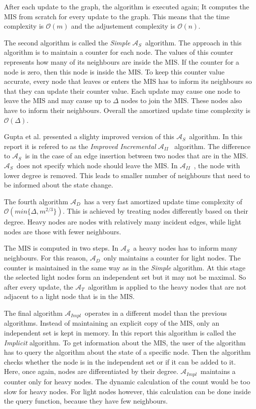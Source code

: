 \documentclass[letterpaper,11pt]{article}
\newcommand{\trivial}{$\mathcal{A}_T$\ }
\newcommand{\simple}{$\mathcal{A}_S$\ }
\newcommand{\improvedinc}{$\mathcal{A}_{II}$\ }
\newcommand{\dynamic}{$\mathcal{A}_{D}$\ }
\newcommand{\implicit}{$\mathcal{A}_{Impl}$\ }
\newcommand{\OD}{$\mathcal{O}(\Delta)$}
\begin{document}

After each update to the graph, the algorithm is executed again; It computes the
MIS from scratch for every update to the graph. This means that the time
complexity is $\mathcal{O}(m)$ and the adjustement complexity is
$\mathcal{O}(n)$.

The second algorithm is called the \textit{Simple} \simple algorithm. The
approach in this algorithm is to maintain a counter for each node. The values of
this counter represents how many of its neighbours are inside the MIS. If the
counter for a node is zero, then this node is inside the MIS. To keep this
counter value accurate, every node that leaves or enters the MIS has to inform
its neighbours so that they can update their counter value. Each update may
cause one node to leave the MIS and may cause up to $\Delta$ nodes to join the
MIS. These nodes also have to inform their neighbours. Overall the amortized
update time complexity is \OD.

Gupta et al. presented a slighty improved version of this \simple algorithm. In
this report it is refered to as the \textit{Improved Incremental} \improvedinc
algorithm. The difference to \simple is in the case of an edge insertion between
two nodes that are in the MIS. \simple does not specify which node should leave
the MIS. In \improvedinc, the node with lower degree is removed. This leads to
smaller number of neighbours that need to be informed about the state change.

The fourth algorithm \dynamic has a very fast amortized update time complexity
of \linebreak $\mathcal{O}(min\{\Delta, m^{2/3}\})$.
This is achieved by treating nodes differently based on their degree.
Heavy nodes are nodes with relatively many incident edges, while light nodes are
those with fewer neighbours.

The MIS is computed in two steps. In \simple a heavy nodes has to inform many
neighbours. For this reason, \dynamic only maintains a counter for light nodes.
The counter is maintained in the same way as in the \textit{Simple} algorithm.
At this stage the selected light nodes form an independent set but it may not be
maximal. So after every update, the \trivial algorithm is applied to the heavy
nodes that are not adjacent to a light node that is in the MIS.

The final algorithm \implicit operates in a different model than the previous
algorithms. Instead of maintaining an explicit copy of the MIS, only an
independent set is kept in memory. In this report this algorithm is called the
\textit{Implicit} algorithm. To get information about the MIS, the user of the
algorithm has to query the algorithm about the state of a specific node. Then
the algorithm checks whether the node is in the independent set or if it can be
added to it. Here, once again, nodes are differentiated by their degree.
\implicit maintains a counter only for heavy nodes. The dynamic calculation of
the count would be too slow for heavy nodes. For light nodes however, this
calculation can be done inside the query function, because they have few
neighbours.
\end{document}
